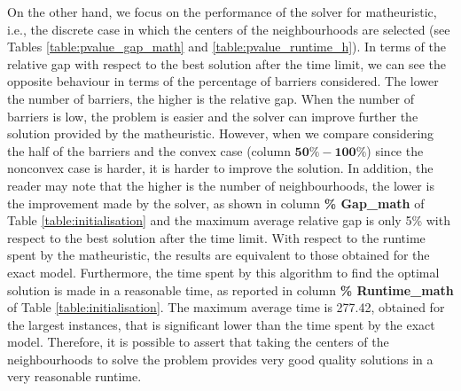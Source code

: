 \documentclass[a4paper,  review, authoryear, 1p.]{elsarticle}
\newcommand{\CV}[1]{{\color{blue}#1}}
\begin{document}
		\CV{
		On the other hand, we focus on the performance of the solver for matheuristic, i.e., the discrete case in which the centers of the neighbourhoods are selected (see Tables \ref{table:pvalue_gap_math} and \ref{table:pvalue_runtime_h}). In terms of the relative gap with respect to the best solution after the time limit, we can see the opposite behaviour in terms of the percentage of barriers considered. The lower the number of barriers, the higher is the relative gap. When the number of barriers is low, the problem is easier and the solver can improve further the solution provided by the matheuristic. However, when we compare considering the half of the barriers and the convex case (column $\bm{50\%-100\%}$) since the nonconvex case is harder, it is harder to improve the solution. In addition, the reader may note that the higher is the number of neighbourhoods, the lower is the improvement made by the solver, as shown in column \textbf{\% Gap\_math} of Table \ref{table:initialisation} and the maximum average relative gap is only 5\% with respect to the best solution after the time limit. With respect to the runtime spent by the matheuristic, the results are equivalent to those obtained for the exact model. Furthermore, the time spent by this algorithm to find the optimal solution is made in a reasonable time, as reported in column \textbf{\% Runtime\_math} of Table \ref{table:initialisation}. The maximum average time is 277.42, obtained for the largest instances, that is significant lower than the time spent by the exact model. Therefore, it is possible to assert that taking the centers of the neighbourhoods to solve the problem provides very good quality solutions in a very reasonable runtime.
		
		}
			
				
				
%				
%		
		
\end{document}
